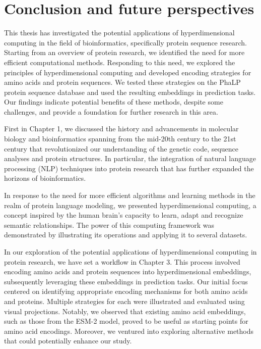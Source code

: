 \chapter{Conclusion and future perspectives}
This thesis has investigated the potential applications of hyperdimensional computing in the field of bioinformatics, specifically protein sequence research. Starting from an overview of protein research, we identified the need for more efficient computational methods. Responding to this need, we explored the principles of hyperdimensional computing and developed encoding strategies for amino acids and protein sequences. We tested these strategies on the PhaLP protein sequence database and used the resulting embeddings in prediction tasks. Our findings indicate potential benefits of these methods, despite some challenges, and provide a foundation for further research in this area.

First in Chapter 1, we discussed the history and advancements in molecular biology and bioinformatics spanning from the mid-20th century to the 21st century that revolutionized our understanding of the genetic code, sequence analyses and protein structures. In particular, the integration of natural language processing (NLP) techniques into protein research that has further expanded the horizons of bioinformatics.

In response to the need for more efficient algorithms and learning methods in the realm of protein language modeling, we presented hyperdimensional computing, a concept inspired by the human brain's capacity to learn, adapt and recognize semantic relationships. The power of this computing framework was demonstrated by illustrating its operations and applying it to several datasets.

In our exploration of the potential applications of hyperdimensional computing in protein research, we have set a workflow in Chapter 3. This process involved encoding amino acids and protein sequences into hyperdimensional embeddings, subsequently leveraging these embeddings in prediction tasks. Our initial focus centered on identifying appropriate encoding mechanisms for both amino acids and proteins. Multiple strategies for each were illustrated and evaluated using visual projections. Notably, we observed that existing amino acid embeddings, such as those from the \mbox{ESM-2} model, proved to be useful as starting points for amino acid encodings. Moreover, we ventured into exploring alternative methods that could potentially enhance our study.

